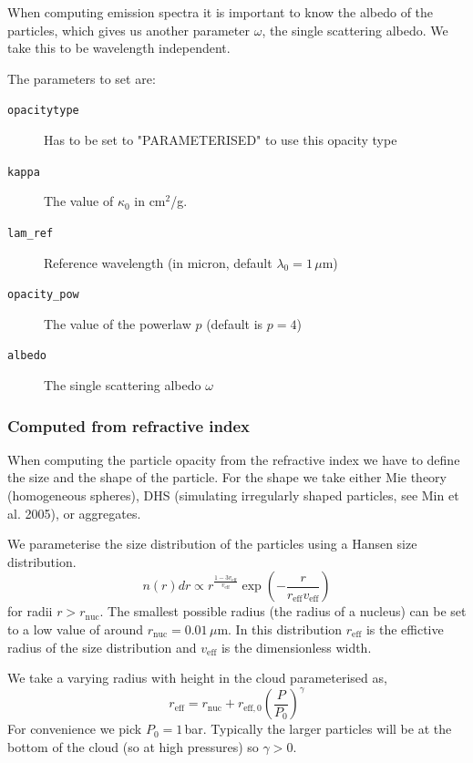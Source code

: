\documentclass[12pt]{article}
\begin{document}
When computing emission spectra it is important to know the albedo of the particles, which gives us another parameter $\omega$, the single scattering albedo. We take this to be wavelength independent.

The parameters to set are:
\begin{description}
\item[\texttt{opacitytype}]
Has to be set to "PARAMETERISED" to use this opacity type
\item[\texttt{kappa}]
The value of $\kappa_0$ in cm$^2$/g.
\item[\texttt{lam\_ref}]
Reference wavelength (in micron, default $\lambda_0=1\,\mu$m)
\item[\texttt{opacity\_pow}]
The value of the powerlaw $p$ (default is $p=4$)
\item[\texttt{albedo}]
The single scattering albedo $\omega$
\end{description}

\subsubsection{Computed from refractive index}

When computing the particle opacity from the refractive index we have to define the size and the shape of the particle. For the shape we take either Mie theory (homogeneous spheres), DHS (simulating irregularly shaped particles, see Min et al. 2005), or aggregates.

We parameterise the size distribution of the particles using a Hansen size distribution.
\begin{equation}
n(r)dr\propto r^\frac{1-3v_\mathrm{eff}}{v_\mathrm{eff}} \exp\left(-\frac{r}{r_\mathrm{eff}v_\mathrm{eff}}\right)
\end{equation}
for radii $r > r_\mathrm{nuc}$. The smallest possible radius (the radius of a nucleus) can be set to a low value of around $r_\mathrm{nuc}=0.01\,\mu$m. In this distribution $r_\mathrm{eff}$ is the effictive radius of the size distribution and $v_\mathrm{eff}$ is the dimensionless width.

We take a varying radius with height in the cloud parameterised as,
\begin{equation}
r_\mathrm{eff}=r_\mathrm{nuc}+r_\mathrm{eff,0}\left(\frac{P}{P_0}\right)^\gamma
\end{equation}
For convenience we pick $P_0=1\,$bar. Typically the larger particles will be at the bottom of the cloud (so at high pressures) so $\gamma>0$.
\end{document}
